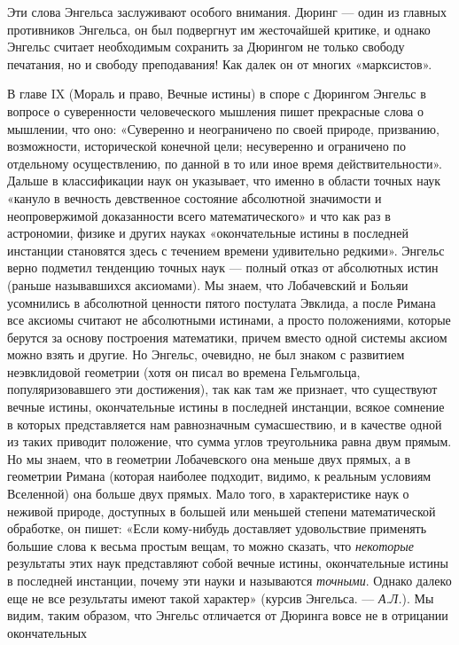 Эти слова Энгельса заслуживают особого внимания. Дюринг --- один из главных
противников Энгельса, он был подвергнут им жесточайшей критике, и однако
Энгельс считает необходимым сохранить за Дюрингом не только свободу печатания,
но и свободу преподавания! Как далек он от многих «марксистов».

В главе IX (Мораль и право, Вечные истины) в споре с Дюрингом Энгельс в вопросе
о суверенности человеческого мышления пишет прекрасные слова о мышлении, что
оно: «Суверенно и неограничено по своей природе, призванию, возможности,
исторической конечной цели; несуверенно и ограничено по отдельному
осуществлению, по данной в то или иное время действительности». Дальше в
классификации наук он указывает, что именно в области точных наук «кануло в
вечность девственное состояние абсолютной значимости и неопровержимой
доказанности всего математического» и что как раз в астрономии, физике и других
науках «окончательные истины в последней инстанции становятся здесь с течением
времени удивительно редкими». Энгельс верно подметил тенденцию точных наук ---
полный отказ от абсолютных истин (раньше называвшихся аксиомами). Мы знаем, что
Лобачевский и Больяи усомнились в абсолютной ценности пятого постулата Эвклида,
а после Римана все аксиомы считают не абсолютными истинами, а просто
положениями, которые берутся за основу построения математики, причем вместо
одной системы аксиом можно взять и другие. Но Энгельс, очевидно, не был знаком
с развитием неэвклидовой геометрии (хотя он писал во времена Гельмгольца,
популяризовавшего эти достижения), так как там же признает, что существуют
вечные истины, окончательные истины в последней инстанции, всякое сомнение в
которых представляется нам равнозначным сумасшествию, и в качестве одной из
таких приводит положение, что сумма углов треугольника равна двум прямым. Но мы
знаем, что в геометрии Лобачевского она меньше двух прямых, а в геометрии
Римана (которая наиболее подходит, видимо, к реальным условиям Вселенной) она
больше двух прямых. Мало того, в характеристике наук о неживой природе,
доступных в большей или меньшей степени математической обработке, он пишет:
«Если кому-нибудь доставляет удовольствие применять большие слова к весьма
простым вещам, то можно сказать, что \emph{некоторые} результаты этих наук
представляют собой вечные истины, окончательные истины в последней инстанции,
почему эти науки и называются \emph{точными}. Однако далеко еще не все результаты
имеют такой характер» (курсив Энгельса. --- \emph{А.Л.}). Мы видим, таким
образом, что Энгельс отличается от Дюринга вовсе не в отрицании окончательных
